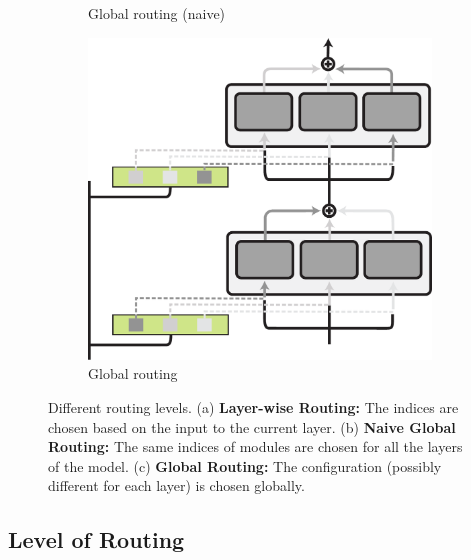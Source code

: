 \documentclass[10pt]{article} %
\begin{document}
\begin{figure}[t]
\begin{subfigure}{.30\linewidth}
        \caption{Global routing (naive)}
        \label{fig:routing:naive_global_routing}
    \end{subfigure}
    \begin{subfigure}{.30\linewidth}
    \centering
        \includegraphics[width=.99\linewidth]{img/true_global_routing.pdf}  
        \caption{Global routing}
        \label{fig:routing:true_global_routing}
    \end{subfigure}
    \caption{ Different routing levels. (a) \textbf{Layer-wise Routing:} The indices are chosen based on the input to the current layer. (b) \textbf{Naive Global Routing:} The same indices of modules are chosen for all the layers of the model. (c) \textbf{Global Routing:} The configuration (possibly different for each layer) is chosen globally. 
    }
\label{fig:Routing_level}
\end{figure}

\subsection{Level of Routing}
\end{document}
